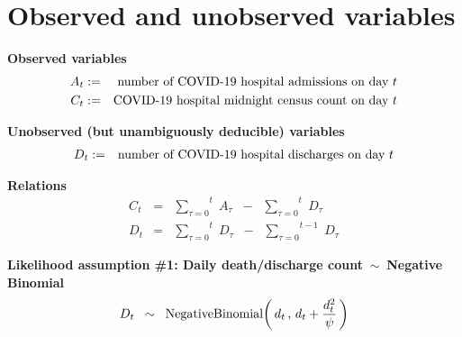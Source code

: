 

\section{Observed and unobserved variables}
\setcounter{theorem}{0}
\setcounter{equation}{0}


\renewcommand{\theenumi}{\roman{enumi}}
\renewcommand{\labelenumi}{\textnormal{(\theenumi)}$\;\;$}


\noindent
\textbf{Observed variables}
\begin{eqnarray*}
A_{t}
& := &
	\textnormal{number of COVID-19 hospital admissions on day $t$} 
\\
C_{t}
& := &
	\textnormal{COVID-19 hospital midnight census count on day $t$} 
\end{eqnarray*}


\vskip 0.5cm
\noindent
\textbf{Unobserved (but unambiguously deducible) variables}
\begin{eqnarray*}
D_{t}
& := &
	\textnormal{number of COVID-19 hospital discharges on day $t$} 
\\
\end{eqnarray*}


\vskip 0.3cm
\noindent
\textbf{Relations}
\begin{eqnarray*}
C_{t}
& = &
	\overset{t}{\underset{\tau=0}{\sum}} \; A_{\tau}
	\;\; - \;\;
	\overset{t}{\underset{\tau=0}{\sum}} \; D_{\tau}
\\
D_{t}
& = &
	\overset{t}{\underset{\tau=0}{\sum}} \; D_{\tau}
	\;\; - \;\;
	\overset{t-1}{\underset{\tau=0}{\sum}} \; D_{\tau}
\end{eqnarray*}


\vskip 0.5cm
\noindent
\textbf{Likelihood assumption \#1: Daily death/discharge count \,$\sim$\, Negative Binomial}
\begin{equation*}
D_{t}
\;\; \sim \;\;
	\textnormal{NegativeBinomial}\!\left(\,d_{t}\,,\,d_{t}+\dfrac{d_{t}^{2}}{\psi}\,\right)
\end{equation*}

